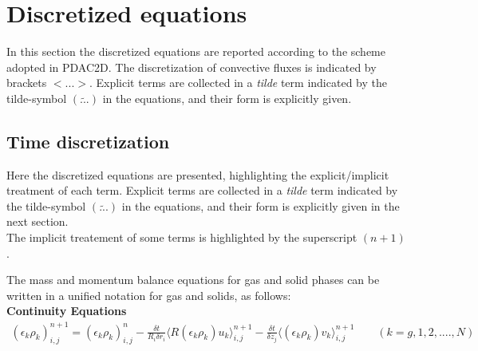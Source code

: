 \section{Discretized equations \label{ch:FV}}
In this section the discretized equations are reported according to the scheme adopted
in PDAC2D. The discretization of convective fluxes is indicated by brackets
$<...>$. 
Explicit terms are collected in a {\em tilde} term indicated by the 
tilde-symbol $(\widetilde{...})$ in the equations, and their form is explicitly 
given.

\subsection{Time discretization}

Here the discretized equations are presented, highlighting the 
explicit/implicit treatment of each term.
Explicit terms are collected in a {\em tilde} term indicated by the 
tilde-symbol $(\widetilde{...})$ in the equations, and their form is 
explicitly given in the next section.\\
The implicit treatement of some terms is highlighted by the superscript $(n+1)$.

The mass and momentum balance equations for gas and solid phases can be written in a 
unified notation for gas and solids, as follows:\\

%
{\bf Continuity Equations}\\
%
\begin{eqnarray}
(\epsilon_k \rho_k)_{i,j}^{n+1} = (\epsilon_k \rho_k)_{i,j}^{n} -
\frac{\delta t}{R_i \delta r_i} \langle R(\epsilon_k \rho_k) u_k \rangle_{i,j}^{n+1}-
\frac{\delta t}{\delta z_j} \langle (\epsilon_k \rho_k) v_k \rangle_{i,j}^{n+1}
\qquad (k=g,1,2, ....,N)
\nonumber
\end{eqnarray}\\

